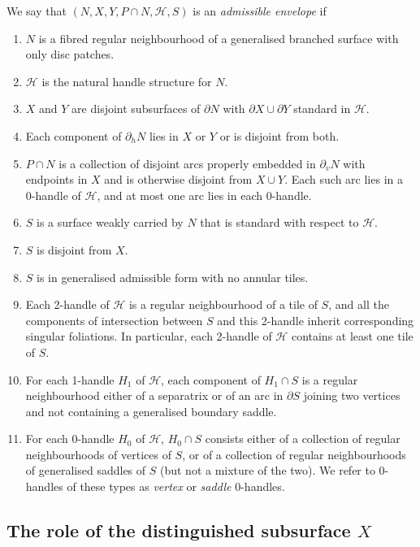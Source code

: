 \documentclass[oneside]{amsart}
\numberwithin{equation}{section}
\theoremstyle{plain}
\theoremstyle{definition}
\newcommand{\calH}{\mathcal{H}}
\begin{document}
We say that $(N, X, Y, P \cap N, \mathcal{H}, S)$ is an \emph{admissible envelope} if
\begin{enumerate}
\item $N$ is a fibred regular neighbourhood of a generalised branched surface with only disc patches.
\item $\mathcal{H}$ is the natural handle structure for $N$.
\item $X$ and $Y$ are disjoint subsurfaces of $\partial N$ with $\partial X \cup \partial Y$ standard in $\mathcal{H}$.
\item Each component of $\partial_h N$ lies in $X$ or $Y$ or is disjoint from both.
\item $P \cap N$ is a collection of disjoint arcs properly embedded in $\partial_v N$ with endpoints in $X$ and is otherwise disjoint from $X \cup Y$.
Each such arc lies in a 0-handle of $\calH$, and at most one arc lies in each 0-handle.
\item $S$ is a surface weakly carried by $N$ that is standard with respect to $\mathcal{H}$.
\item $S$ is disjoint from $X$.
\item $S$ is in generalised admissible form with no annular tiles.
\item Each 2-handle of $\mathcal{H}$ is a regular neighbourhood of a tile of $S$, and all the components
of intersection between $S$ and this 2-handle inherit corresponding singular foliations. In particular,
each 2-handle of $\mathcal{H}$ contains at least one tile of $S$.
\item For each 1-handle $H_1$ of $\mathcal{H}$, each component of $H_1 \cap S$ is a regular neighbourhood
either of a separatrix or of an arc in $\partial S$ joining two vertices and not containing a generalised boundary saddle.
\item For each 0-handle $H_0$ of $\mathcal{H}$, $H_0 \cap S$ consists either of a collection of regular neighbourhoods
of vertices of $S$, or of a collection of regular neighbourhoods of generalised saddles of $S$ (but not a mixture of the two). We
refer to 0-handles of these types as \emph{ vertex} or \emph{ saddle} 0-handles.
\end{enumerate}

\subsection{The role of the distinguished subsurface $X$}
\end{document}

